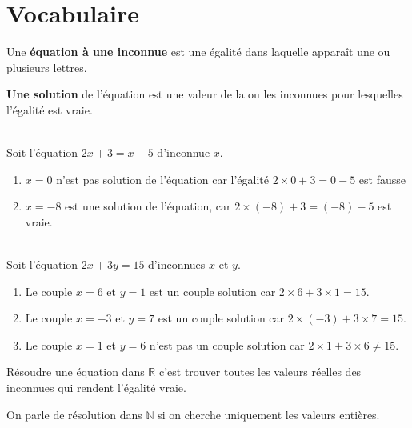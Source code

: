 %	
%	 


\section{Vocabulaire}
Une \textbf{équation à une inconnue} est une égalité dans laquelle apparaît une ou plusieurs lettres.

\textbf{Une solution} de l’équation est une valeur de la ou les inconnues pour lesquelles l’égalité est vraie. 
\begin{example}\hfill \\
	Soit l'équation $2x+3=x-5$ d'inconnue $x$.
	\begin{enumerate}[label=\alph*),leftmargin=*]
		\item $x=0$ n'est pas solution de l'équation car l'égalité $2\times 0+3=0-5$ est fausse
		\item $x=-8$ est une solution de l'équation, car $2\times(-8)+3=(-8)-5$ est vraie.
	\end{enumerate}
\end{example}
\begin{example}\hfill \\
	Soit l'équation $2x+3y=15$ d'inconnues $x$ et $y$.
	\begin{enumerate}[label=\alph*),leftmargin=*]
		\item Le couple  $x=6$ et $y=1$  est un couple solution car $2\times 6+3\times 1=15$.
		\item Le couple  $x=-3$ et $y=7$  est un couple solution car $2\times (-3)+3\times 7=15$.
		\item Le couple $x=1$ et $y=6$ n'est pas un couple solution car $2\times 1+3\times 6\neq 15$.  
	\end{enumerate}
\end{example}
\begin{definition} Résoudre une équation dans $\mathbb{R}$ c'est trouver toutes les valeurs  réelles des  inconnues qui rendent l'égalité vraie.
	
	On parle de résolution dans   $\mathbb{N}$ si on cherche uniquement les valeurs entières.
\end{definition} 
